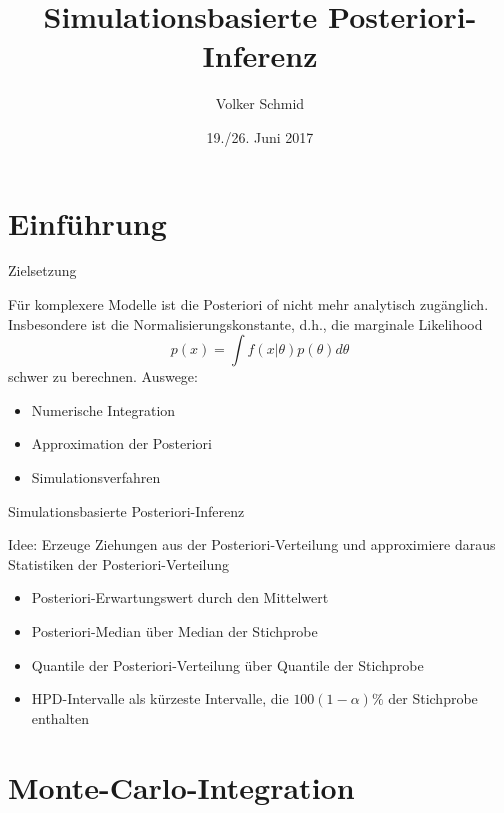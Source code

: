 \documentclass[ignorenonframetext,]{beamer}
\title{Simulationsbasierte Posteriori-Inferenz}
\author{Volker Schmid}
\date{19./26. Juni 2017}
\providecommand{\tightlist}{%
\setlength{\itemsep}{0pt}\setlength{\parskip}{0pt}}
\begin{document}
\frame{\titlepage}

\begin{frame}
\tableofcontents[hideallsubsections]
\end{frame}

\section{Einführung}\label{einfuhrung}

\begin{frame}{Zielsetzung}

Für komplexere Modelle ist die Posteriori of nicht mehr analytisch
zugänglich. Insbesondere ist die Normalisierungskonstante, d.h., die
marginale Likelihood \[
p(x)=\int f(x|\theta)p(\theta)d\theta
\] schwer zu berechnen. Auswege:

\begin{itemize}
\tightlist
\item
  Numerische Integration
\item
  Approximation der Posteriori
\item
  Simulationsverfahren
\end{itemize}

\end{frame}

\begin{frame}{Simulationsbasierte Posteriori-Inferenz}

Idee: Erzeuge Ziehungen aus der Posteriori-Verteilung und approximiere
daraus Statistiken der Posteriori-Verteilung

\begin{itemize}
\tightlist
\item
  Posteriori-Erwartungswert durch den Mittelwert
\item
  Posteriori-Median über Median der Stichprobe
\item
  Quantile der Posteriori-Verteilung über Quantile der Stichprobe
\item
  HPD-Intervalle als kürzeste Intervalle, die \(100(1-\alpha)\%\) der
  Stichprobe enthalten
\end{itemize}

\end{frame}

\section{Monte-Carlo-Integration}\label{monte-carlo-integration}
\end{document}
